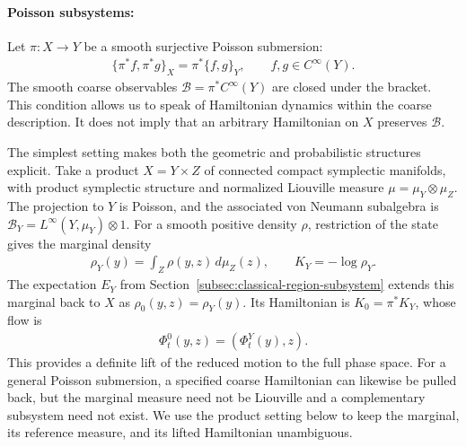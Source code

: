\documentclass[a4paper,11pt]{article}
\theoremstyle{definition}
\newcommand{\mB}{\mathcal{B}}
\begin{document}
\paragraph{Poisson subsystems:}
Let $\pi:X\to Y$ be a smooth surjective Poisson submersion:
\begin{align}\label{eq:classical-Poisson-subsystem}
    \{\pi^*f,\pi^*g\}_X=\pi^*\{f,g\}_Y,
    \qquad f,g\in C^\infty(Y).
\end{align}
The smooth coarse observables $\mathcal B=\pi^*C^\infty(Y)$ are closed under the bracket. This condition allows us to speak of Hamiltonian dynamics within the coarse description. It does not imply that an arbitrary Hamiltonian on $X$ preserves $\mathcal B$.

The simplest setting makes both the geometric and probabilistic structures explicit. Take a product $X=Y\times Z$ of connected compact symplectic manifolds, with product symplectic structure and normalized Liouville measure $\mu=\mu_Y\otimes\mu_Z$. The projection to $Y$ is Poisson, and the associated von Neumann subalgebra is $\mB_Y=L^\infty(Y,\mu_Y)\otimes1$. For a smooth positive density $\rho$, restriction of the state gives the marginal density
\begin{align}\label{eq:classical-marginal-Hamiltonian}
    \rho_Y(y)=\int_Z\rho(y,z)\,d\mu_Z(z),\qquad
    K_Y=-\log\rho_Y.
\end{align}
The expectation $E_Y$ from Section~\ref{subsec:classical-region-subsystem} extends this marginal back to $X$ as $\rho_0(y,z)=\rho_Y(y)$. Its Hamiltonian is $K_0=\pi^*K_Y$, whose flow is
\begin{align}
    \Phi_t^0(y,z)=(\Phi_t^Y(y),z).
\end{align}
This provides a definite lift of the reduced motion to the full phase space. For a general Poisson submersion, a specified coarse Hamiltonian can likewise be pulled back, but the marginal measure need not be Liouville and a complementary subsystem need not exist. We use the product setting below to keep the marginal, its reference measure, and its lifted Hamiltonian unambiguous.
\end{document}
